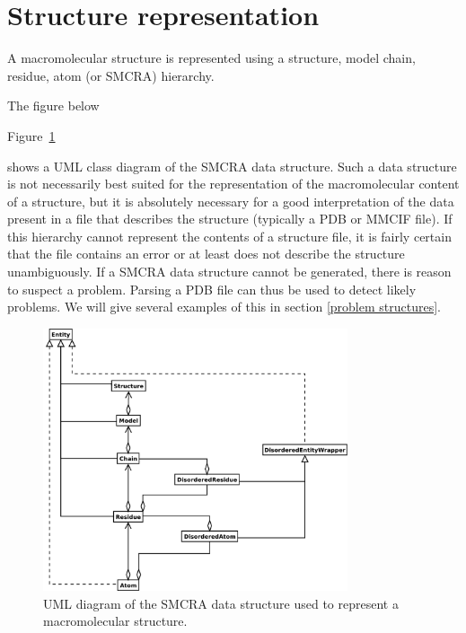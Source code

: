 \documentclass{report}
\begin{document}
\section{Structure representation}

A macromolecular structure is represented using a structure, model chain,
residue, atom (or SMCRA) hierarchy.
\begin{htmlonly}
The figure below
\end{htmlonly}
\begin{latexonly}
Figure~\ref{fig:smcra}
\end{latexonly}
shows a UML
class diagram of the SMCRA data structure.  Such a data structure is not
necessarily best suited for the representation of the macromolecular content of
a structure, but it is absolutely necessary for a good interpretation of the
data present in a file that describes the structure (typically a PDB or MMCIF
file). If this hierarchy cannot represent the contents of a structure file, it
is fairly certain that the file contains an error or at least does not describe
the structure unambiguously. If a SMCRA data structure cannot be generated,
there is reason to suspect a problem. Parsing a PDB file can thus be used to
detect likely problems. We will give several examples of this in section
\ref{problem structures}.

\begin{htmlonly}
\label{fig:smcra}
\end{htmlonly}

\begin{latexonly}
\begin{figure}[htbp]
\centering
\includegraphics[width=0.8\textwidth]{images/smcra.png}
\caption{UML diagram of the SMCRA data structure
used to represent a macromolecular structure.}
\label{fig:smcra}
\end{figure}
\end{latexonly}
\end{document}
